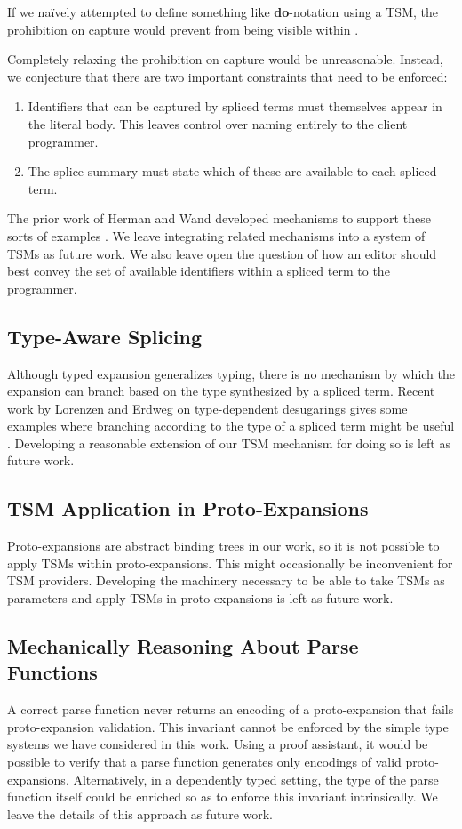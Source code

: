If we na\"ively attempted to define something like \textbf{do}-notation using a TSM, the prohibition on capture would prevent  from being visible within .

Completely relaxing the prohibition on capture would be unreasonable. Instead, we conjecture that there are two important constraints that need to be enforced:
\begin{enumerate}
  \item Identifiers that can be captured by spliced terms must themselves appear in the literal body. This leaves control over naming entirely to the client programmer.
  \item The splice summary must state which of these are available to each spliced term.
\end{enumerate}

The prior work of Herman and Wand developed mechanisms to support these sorts of examples \cite{DBLP:conf/esop/HermanW08,Herman10:Theory}. We leave integrating related mechanisms into a system of TSMs as future work. We also leave open the question of how an editor should best convey the set of available identifiers within a spliced term to the programmer.

\subsection{Type-Aware Splicing}\label{sec:type-aware-splicing}
Although typed expansion generalizes typing, there is no mechanism by which the expansion can branch based on the type synthesized by a spliced term. Recent work by Lorenzen and Erdweg on type-dependent desugarings gives some examples where branching according to the type of a spliced term might be useful \cite{conf/popl/LorenzenE16}. Developing a reasonable extension of our TSM mechanism for doing so is left as future work.

\subsection{TSM Application in Proto-Expansions}
Proto-expansions are abstract binding trees in our work, so it is not possible to apply TSMs within proto-expansions. This might occasionally be inconvenient for TSM providers. Developing the machinery necessary to be able to take TSMs as parameters and apply TSMs in proto-expansions is left as future work.

\subsection{Mechanically Reasoning About Parse Functions}\label{sec:verifying-tsms}
A correct parse function never returns an encoding of a proto-expansion that fails proto-expansion validation. This invariant cannot be enforced by the simple type systems we have considered in this work. Using a proof assistant, it would be possible to verify that a parse function generates only encodings of valid proto-expansions. Alternatively, in a dependently typed setting, the type of the parse function itself could be enriched so as to enforce this invariant intrinsically. We leave the details of this approach as future work.

